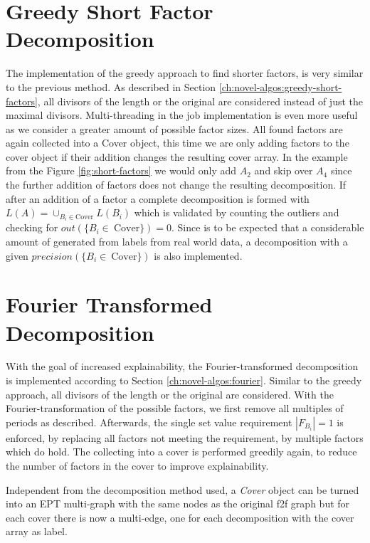 \section{Greedy Short Factor Decomposition}
\label{ch:Implementation:greedy-short-factor}
The implementation of the greedy approach to find shorter factors, is very similar to the previous method.
As described in Section \ref{ch:novel-algos:greedy-short-factors}, all divisors of the length or the original \DFA are considered instead of just the maximal divisors.
Multi-threading in the job implementation is even more useful as we consider a greater amount of possible factor sizes.
All found factors are again collected into a Cover object, this time we are only adding factors to the cover object if their addition changes the resulting cover array.
In the example from the Figure \ref{fig:short-factors} we would only add $A_2$ and skip over $A_4$ since the further addition of factors does not change the resulting decomposition.
If after an addition of a factor a complete decomposition is formed with $L(A) = \cup_{B_i \in \text{Cover}} L(B_i)$ which is validated by counting the outliers and checking for $out(\{B_i \in~\text{Cover}\}) = 0$.
Since is to be expected that a considerable amount of \DFAs generated from labels from real world data, a decomposition with a given $precision(\{B_i \in~\text{Cover}\})$ is also implemented.

\section{Fourier Transformed Decomposition}
\label{ch:Implementation:fourier-transform}
With the goal of increased explainability, the Fourier-transformed decomposition is implemented according to Section \ref{ch:novel-algos:fourier}.
Similar to the greedy approach, all divisors of the length or the original \DFA are considered.
With the Fourier-transformation of the possible factors, we first remove all multiples of periods as described.
Afterwards, the single set value requirement $|F_{B_i}| = 1$ is enforced, by replacing all factors not meeting the requirement, by multiple factors which do hold.
The collecting into a cover is performed greedily again, to reduce the number of factors in the cover to improve explainability.

Independent from the decomposition method used, a \textit{Cover} object can be turned into an EPT multi-graph with the same nodes as the original f2f graph but for each cover there is now a multi-edge, one for each decomposition with the cover array as label.

